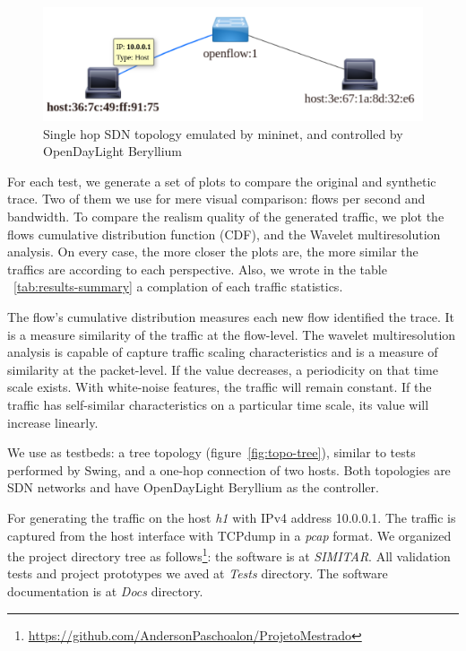 \begin{figure}[!ht]
	\centering
	\includegraphics[scale=0.4]{figures/ch5/topo-simple}
	\caption{Single hop SDN topology emulated by mininet, and controlled by OpenDayLight Beryllium}
	\label{fig:topo-simple}
\end{figure}


For each test, we generate a set of plots to compare the original and synthetic trace. Two of them we use for mere visual comparison: flows per second and bandwidth. To compare the realism quality of the generated traffic, we plot the flows cumulative distribution function (CDF)\cite{harpoon-paper}, and the Wavelet multiresolution analysis.  On every case, the more closer the plots are, the more similar the traffics are according to each perspective. Also, we wrote in the table ~\ref{tab:results-summary} a complation of each traffic statistics. 

The flow's cumulative distribution measures each new flow identified the trace. It is a measure similarity of the traffic at the flow-level.  The wavelet multiresolution analysis is capable of capture traffic scaling characteristics and is a measure of similarity at the packet-level. If the value decreases, a periodicity on that time scale exists. With white-noise features, the traffic will remain constant. If the traffic has self-similar characteristics on a particular time scale, its value will increase linearly.

We use as testbeds: a tree topology (figure~\ref{fig:topo-tree}), similar to tests performed by Swing\cite{swing-paper}\cite{background-traffic-matter}\cite{legotg-paper}, and a one-hop connection of two hosts. Both topologies are SDN networks and have OpenDayLight Beryllium as the controller.

For generating the traffic on the host \textit{h1} with IPv4 address 10.0.0.1. The traffic is captured from the host interface with TCPdump in a \textit{pcap} format.  We organized the project directory tree as follows\footnote{ \href{https://github.com/AndersonPaschoalon/ProjetoMestrado}{https://github.com/AndersonPaschoalon/ProjetoMestrado} }: the software is at \textit{SIMITAR}. All validation tests and project prototypes we aved at \textit{Tests} directory. The software documentation is at \textit{Docs} directory.

